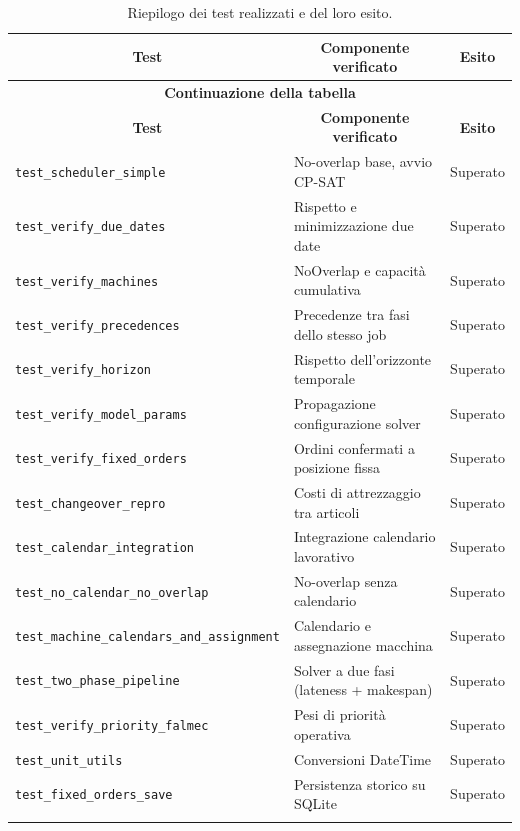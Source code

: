 \begin{center}
\begin{longtable}{|p{4.8cm}|p{5.5cm}|p{2.2cm}|}
\hline
\multicolumn{1}{|c|}{\textbf{Test}} &
\multicolumn{1}{c|}{\textbf{Componente verificato}} &
\multicolumn{1}{c|}{\textbf{Esito}} \\
\hline
\endfirsthead
\hline
\multicolumn{3}{c}{{\bfseries Continuazione della tabella}}\\
\hline
\multicolumn{1}{|c|}{\textbf{Test}} &
\multicolumn{1}{c|}{\textbf{Componente verificato}} &
\multicolumn{1}{c|}{\textbf{Esito}} \\
\hline
\endhead

\texttt{test\_scheduler\_simple} & No-overlap base, avvio CP-SAT & Superato \\
\hline
\texttt{test\_verify\_due\_dates} & Rispetto e minimizzazione due date & Superato \\
\hline
\texttt{test\_verify\_machines} & NoOverlap e capacità cumulativa & Superato \\
\hline
\texttt{test\_verify\_precedences} & Precedenze tra fasi dello stesso job & Superato \\
\hline
\texttt{test\_verify\_horizon} & Rispetto dell'orizzonte temporale & Superato \\
\hline
\texttt{test\_verify\_model\_params} & Propagazione configurazione solver & Superato \\
\hline
\texttt{test\_verify\_fixed\_orders} & Ordini confermati a posizione fissa & Superato \\
\hline
\texttt{test\_changeover\_repro} & Costi di attrezzaggio tra articoli & Superato \\
\hline
\texttt{test\_calendar\_integration} & Integrazione calendario lavorativo & Superato \\
\hline
\texttt{test\_no\_calendar\_no\_overlap} & No-overlap senza calendario & Superato \\
\hline
\texttt{test\_machine\_calendars\_and\_assignment} & Calendario e assegnazione macchina & Superato \\
\hline
\texttt{test\_two\_phase\_pipeline} & Solver a due fasi (lateness + makespan) & Superato \\
\hline
\texttt{test\_verify\_priority\_falmec} & Pesi di priorità operativa & Superato \\
\hline
\texttt{test\_unit\_utils} & Conversioni DateTime & Superato \\
\hline
\texttt{test\_fixed\_orders\_save} & Persistenza storico su SQLite & Superato \\
\hline

\caption{Riepilogo dei test realizzati e del loro esito.}
\label{tab:riepilogo_test}
\end{longtable}
\end{center}

